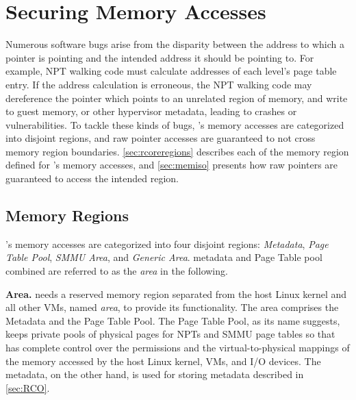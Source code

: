 \chapter{Securing \rustcore{} Memory Accesses}
\label{sec:securercore}

%

%
Numerous software bugs arise from the disparity between the address to which a
pointer is pointing and the intended address it should be pointing to.
For example, NPT walking code must calculate addresses of each level's page
table entry. If the address calculation is erroneous, the NPT walking code may
dereference the pointer which points to an unrelated region of memory, and
write to guest memory, or other hypervisor metadata, leading to crashes or
vulnerabilities.
To tackle these kinds of bugs, \rustcore{}'s memory accesses are categorized
into disjoint regions, and raw pointer accesses are guaranteed to not cross
memory region boundaries. \autoref{sec:rcoreregions} describes each of the
memory region defined for \rustcore{}'s memory accesses, and
\autoref{sec:memiso} presents how raw pointers are guaranteed to access the
intended region.

\section{\rustcore{} Memory Regions}
\label{sec:rcoreregions}

\rustcore{}'s memory accesses are categorized into four disjoint regions:
\textit{\rustcore{} Metadata}, \textit{Page Table Pool},
\textit{SMMU Area}, and \textit{Generic Area}.
\rustcore{} metadata and \rustcore{} Page Table pool combined are referred to as
the \textit{\rustcore{} area} in the following.

\textbf{\rustcore{} Area.}
\rustcore{} needs a reserved memory region separated from the host Linux kernel
and all other VMs, named \textit{\rustcore{} area}, to provide its functionality.
The \rustcore{} area comprises the \rustcore{} Metadata and the \rustcore{} Page Table Pool.
The \rustcore{} Page Table Pool, as its name suggests, keeps private pools of physical pages
for NPTs and SMMU page tables so that \rustcore{} has complete control
over the permissions and the virtual-to-physical mappings of the memory
accessed by the host Linux kernel, VMs, and I/O devices. The \rustcore{} metadata,
on the other hand, is used for storing \rustcore{} metadata described in
\autoref{sec:RCO}.


